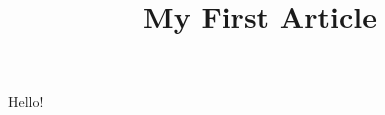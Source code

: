 \documentclass{article}
\begin{document}
\title{My First Article}
\maketitle
 Hello!
\end{document}
